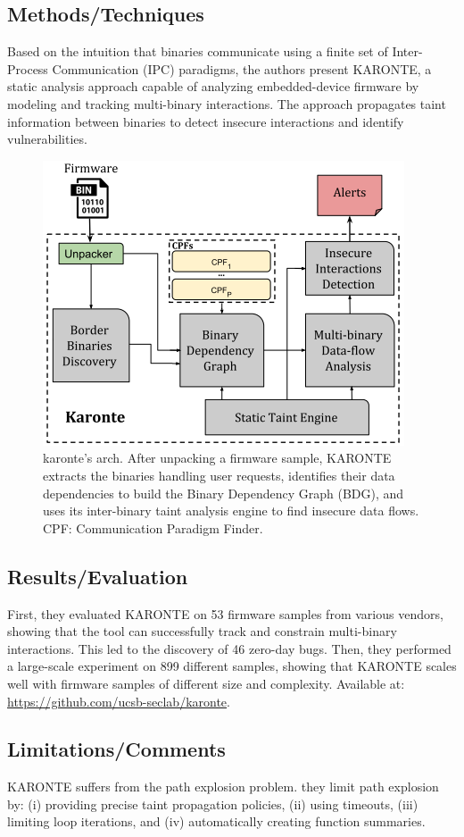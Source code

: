 \subsection{Methods/Techniques}
Based on the intuition that binaries communicate using a finite set of Inter-Process Communication (IPC) paradigms, the authors present KARONTE, a static analysis approach capable of analyzing embedded-device firmware by modeling and tracking multi-binary interactions.  The approach propagates taint information between binaries to detect insecure interactions and identify vulnerabilities.
\begin{figure}[h]
    \centering
    \includegraphics[width=0.7\linewidth]{karonte.png} %
    \caption{karonte's arch.  After unpacking a firmware sample, KARONTE extracts the binaries handling user requests, identifies their data dependencies to build the Binary Dependency Graph (BDG), and uses its inter-binary taint analysis engine to find insecure data flows. CPF: Communication Paradigm Finder.}	
    \label{fig:karonte}
\end{figure}
\subsection{Results/Evaluation}
First, they evaluated KARONTE on 53 firmware samples from various vendors, showing that the tool can successfully track and constrain multi-binary interactions. This led to the discovery of 46 zero-day bugs. Then, they performed a large-scale experiment on 899 different samples, showing that KARONTE scales well with firmware samples of different size and complexity. Available at: \url{https://github.com/ucsb-seclab/karonte}.
\subsection{Limitations/Comments}
KARONTE suffers from the path explosion problem. 
they limit path explosion by: (i) providing precise taint propagation policies, (ii) using timeouts, (iii) limiting loop iterations, and (iv) automatically creating function summaries.

